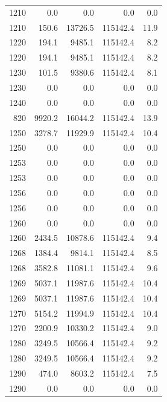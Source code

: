 \begin{longtable}{rrrrr}
    1210 & \num{0.0} & \num{0.0} & \num{0.0} & 0.0 \\
    1210 & \num{150.6} & \num{13726.5} & \num{115142.4} & 11.9 \\
    1220 & \num{194.1} & \num{9485.1} & \num{115142.4} & 8.2 \\
    1220 & \num{194.1} & \num{9485.1} & \num{115142.4} & 8.2 \\
    1230 & \num{101.5} & \num{9380.6} & \num{115142.4} & 8.1 \\
    1230 & \num{0.0} & \num{0.0} & \num{0.0} & 0.0 \\
    1240 & \num{0.0} & \num{0.0} & \num{0.0} & 0.0 \\
    820 & \num{9920.2} & \num{16044.2} & \num{115142.4} & 13.9 \\
    1250 & \num{3278.7} & \num{11929.9} & \num{115142.4} & 10.4 \\
    1250 & \num{0.0} & \num{0.0} & \num{0.0} & 0.0 \\
    1253 & \num{0.0} & \num{0.0} & \num{0.0} & 0.0 \\
    1253 & \num{0.0} & \num{0.0} & \num{0.0} & 0.0 \\
    1256 & \num{0.0} & \num{0.0} & \num{0.0} & 0.0 \\
    1256 & \num{0.0} & \num{0.0} & \num{0.0} & 0.0 \\
    1260 & \num{0.0} & \num{0.0} & \num{0.0} & 0.0 \\
    1260 & \num{2434.5} & \num{10878.6} & \num{115142.4} & 9.4 \\
    1268 & \num{1384.4} & \num{9814.1} & \num{115142.4} & 8.5 \\
    1268 & \num{3582.8} & \num{11081.1} & \num{115142.4} & 9.6 \\
    1269 & \num{5037.1} & \num{11987.6} & \num{115142.4} & 10.4 \\
    1269 & \num{5037.1} & \num{11987.6} & \num{115142.4} & 10.4 \\
    1270 & \num{5154.2} & \num{11994.9} & \num{115142.4} & 10.4 \\
    1270 & \num{2200.9} & \num{10330.2} & \num{115142.4} & 9.0 \\
    1280 & \num{3249.5} & \num{10566.4} & \num{115142.4} & 9.2 \\
    1280 & \num{3249.5} & \num{10566.4} & \num{115142.4} & 9.2 \\
    1290 & \num{474.0} & \num{8603.2} & \num{115142.4} & 7.5 \\
    1290 & \num{0.0} & \num{0.0} & \num{0.0} & 0.0 \\

\end{longtable}
